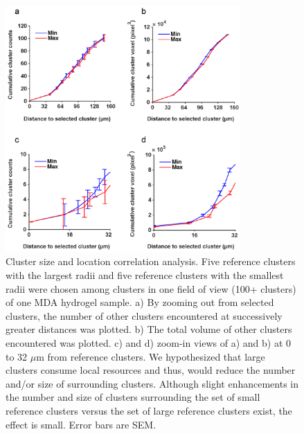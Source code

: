 \begin{figure}
\centering
\includegraphics[keepaspectratio,width=0.8\textwidth]{./figures/10fM001_5ClusterZoomOut}
\caption[Cluster size and location correlation analysis]{Cluster size and location correlation analysis. Five reference clusters with the largest radii and five reference clusters with the smallest radii were chosen among clusters in one field of view (100+ clusters) of one MDA hydrogel sample. a) By zooming out from selected clusters, the number of other clusters encountered at successively greater distances was plotted. b) The total volume of other clusters encountered was plotted. c) and d) zoom-in views of a) and b) at 0 to 32 $\mu$m from reference clusters. We hypothesized that large clusters consume local resources and thus, would reduce the number and/or size of surrounding clusters. Although slight enhancements in the number and size of clusters surrounding the set of small reference clusters versus the set of large reference clusters exist, the effect is small. Error bars are SEM.}
\label{fig:ClusterCorrelation}
\end{figure}

